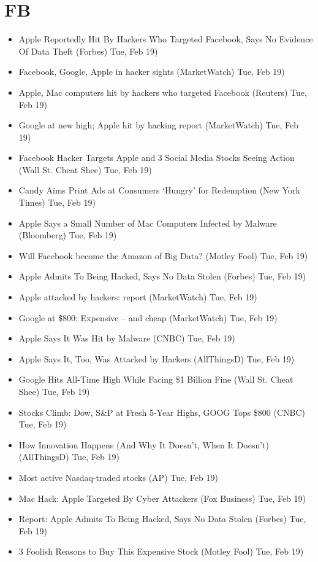 \documentclass[11pt,asymmetric]{article}
\begin{document}
\section*{FB}
\begin{itemize}
\item Apple Reportedly Hit By Hackers Who Targeted Facebook, Says No Evidence Of Data Theft (Forbes) Tue, Feb 19)
\item Facebook, Google, Apple in hacker sights (MarketWatch) Tue, Feb 19)
\item Apple, Mac computers hit by hackers who targeted Facebook (Reuters) Tue, Feb 19)
\item Google at new high; Apple hit by hacking report (MarketWatch) Tue, Feb 19)
\item Facebook Hacker Targets Apple and 3 Social Media Stocks Seeing Action (Wall St. Cheat Shee) Tue, Feb 19)
\item Candy Aims Print Ads at Consumers ‘Hungry’ for Redemption (New York Times) Tue, Feb 19)
\item Apple Says a Small Number of Mac Computers Infected by Malware (Bloomberg) Tue, Feb 19)
\item Will Facebook become the Amazon of Big Data? (Motley Fool) Tue, Feb 19)
\item Apple Admits To Being Hacked, Says No Data Stolen (Forbes) Tue, Feb 19)
\item Apple attacked by hackers: report (MarketWatch) Tue, Feb 19)
\item Google at \$800: Expensive – and cheap (MarketWatch) Tue, Feb 19)
\item Apple Says It Was Hit by Malware (CNBC) Tue, Feb 19)
\item Apple Says It, Too, Was Attacked by Hackers (AllThingsD) Tue, Feb 19)
\item Google Hits All-Time High While Facing \$1 Billion Fine (Wall St. Cheat Shee) Tue, Feb 19)
\item Stocks Climb: Dow, S\&P at Fresh 5-Year Highs, GOOG Tops \$800 (CNBC) Tue, Feb 19)
\item How Innovation Happens (And Why It Doesn't, When It Doesn't) (AllThingsD) Tue, Feb 19)
\item Most active Nasdaq-traded stocks (AP) Tue, Feb 19)
\item Mac Hack: Apple Targeted By Cyber Attackers (Fox Business) Tue, Feb 19)
\item Report: Apple Admits To Being Hacked, Says No Data Stolen (Forbes) Tue, Feb 19)
\item 3 Foolish Reasons to Buy This Expensive Stock (Motley Fool) Tue, Feb 19)

\end{itemize}
\end{document}
